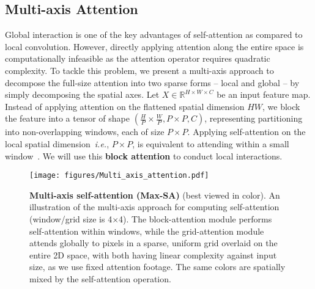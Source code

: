 \documentclass[runningheads]{llncs}
\begin{document}
\subsection{Multi-axis Attention}

Global interaction is one of the key advantages of self-attention as compared to local convolution.
However, directly applying attention along the entire space is computationally infeasible as the attention operator requires quadratic complexity.
To tackle this problem, we present a multi-axis approach to decompose the full-size attention into two sparse forms -- local and global -- by simply decomposing the spatial axes.
Let $X\in \mathbb{R}^{H\times W\times C}$ be an input feature map. Instead of applying attention on the flattened spatial dimension $HW$, we {block} the feature into a tensor of shape $(\frac{H}{P}\times\frac{W}{P},P\times P,C)$, representing partitioning into non-overlapping windows, each of size $P\times P$.
Applying self-attention on the local spatial dimension~\emph{i.e.}, $P\times P$, is equivalent to attending within a small window~\cite{liu2021swin}.
We will use this \textbf{block attention} to conduct local interactions.

\begin{figure}[!t]
\centering
\texttt{[image: figures/Multi\_axis\_attention.pdf]}
\caption{\textbf{Multi-axis self-attention (Max-SA)} (best viewed in color). An illustration of the multi-axis approach for computing self-attention (window/grid size is 4$\times$4). The block-attention module performs self-attention within windows, while the grid-attention module attends globally to pixels in a sparse, uniform grid overlaid on the entire 2D space, with both having linear complexity against input size, as we use fixed attention footage. The same colors are spatially mixed by the self-attention operation.}
\label{fig:MaxViT-block}
\end{figure}
\end{document}
